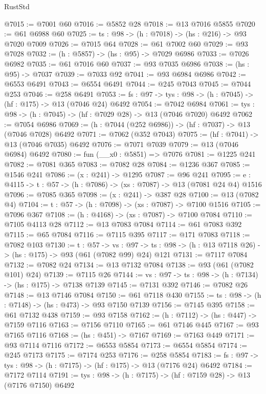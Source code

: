 \begin{lexlean}{RustStd}
\begin{coremodule}
@7015 := @7001 @60
@7016 := @5852 @28
@7018 := @13 @7016 @5855
@7020 := @61 @6988 @60
@7025 := {ts : @98} -> (h : @7018) -> (hs : @216) -> @93 @7020 @7009
@7026 := @7015 @64
@7028 := @61 @7002 @60
@7029 := @93 @7028
@7032 := (h : @5857) -> (hs : @95) -> @7029 @6986
@7033 := @7026 @6982
@7035 := @61 @7016 @60
@7037 := @93 @7035 @6986
@7038 := (hs : @95) -> @7037
@7039 := @7033 @92
@7041 := @93 @6984 @6986
@7042 := @6553 @6491
@7043 := @6554 @6491
@7044 := @245 @7043
@7045 := @7044 @253
@7046 := @258 @6491
@7053 := {fs : @97} -> {tys : @98} -> (h : @7045) -> (hf : @175) -> @13 (@7046 @24) @6492
@7054 := @7042 @6984
@7061 := {tys : @98} -> (h : @7045) -> (hf : @7029 @28) -> @13 (@7046 @7020) @6492
@7062 := @7054 @6986
@7069 := (h : @7044 (@252 @6986)) -> (hf : @7037) -> @13 (@7046 @7028) @6492
@7071 := @7062 (@352 @7043)
@7075 := (hf : @7041) -> @13 (@7046 @7035) @6492
@7076 := @7071 @7039
@7079 := @13 (@7046 @6984) @6492
@7080 := fun (__x0 : @5851) => @7076
@7081 := @1225 @241
@7082 := @7081 @365
@7083 := @7082 @28
@7084 := @1236 @367
@7085 := @1546 @241
@7086 := (x : @241) -> @1295
@7087 := @96 @241
@7095 := {e : @4115} -> {t : @57} -> (h : @7086) -> (xs : @7087) -> @13 (@7081 @24 @4) @1516
@7096 := @7085 @365
@7098 := (x : @241) -> @387 @28
@7100 := @13 (@7082 @4)
@7104 := {t : @57} -> (h : @7098) -> (xs : @7087) -> @7100 @1516
@7105 := @7096 @367
@7108 := (h : @4168) -> (xs : @7087) -> @7100 @7084
@7110 := @7105 @4113 @28
@7112 := @13 @7083 @7084
@7114 := @61 @7083 @392
@7115 := @65 @7084
@7116 := @7115 @395
@7117 := @171 @7083
@7118 := @7082 @103
@7130 := {t : @57} ->
  {vs : @97} -> {ts : @98} -> (h : @13 @7118 @26) -> (hs : @175) -> @93 (@61 (@7082 @99) @24) @121
@7131 := @7117 @7084
@7132 := @7082 @24
@7134 := @13 @7132 @7084
@7138 := @93 (@61 (@7082 @101) @24)
@7139 := @7115 @26
@7144 := {vs : @97} -> {ts : @98} -> (h : @7134) -> (hs : @175) -> @7138 @7139
@7145 := @7131 @392
@7146 := @7082 @26
@7148 := @13 @7146 @7084
@7150 := @61 @7118 @430
@7155 := {ts : @98} -> (h : @7148) -> (hs : @473) -> @93 @7150 @7139
@7156 := @7145 @395
@7158 := @61 @7132 @438
@7159 := @93 @7158
@7162 := (h : @7112) -> (hs : @447) -> @7159 @7116
@7163 := @7156 @7110
@7165 := @61 @7146 @445
@7167 := @93 @7165 @7116
@7168 := (hs : @451) -> @7167
@7169 := @7163 @449
@7171 := @93 @7114 @7116
@7172 := @6553 @5854
@7173 := @6554 @5854
@7174 := @245 @7173
@7175 := @7174 @253
@7176 := @258 @5854
@7183 := {fs : @97} -> {tys : @98} -> (h : @7175) -> (hf : @175) -> @13 (@7176 @24) @6492
@7184 := @7172 @7114
@7191 := {tys : @98} -> (h : @7175) -> (hf : @7159 @28) -> @13 (@7176 @7150) @6492

\end{coremodule}
\end{lexlean}
